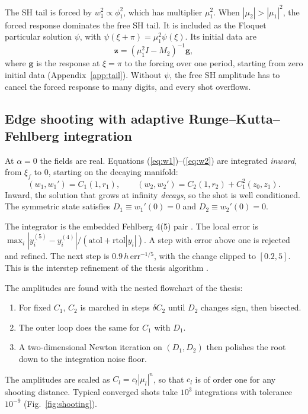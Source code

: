 \documentclass[pra,twocolumn,superscriptaddress,longbibliography]{revtex4-2}
\begin{document}
The SH tail is forced by $w_1^2\propto\phi_1^2$, which has multiplier $\mu_1^2$. When
$|\mu_2| > |\mu_1|^2$, the forced response dominates the free SH tail. It is included as the
Floquet particular solution $\psi$, with $\psi(\xi+\pi)=\mu_1^2\psi(\xi)$. Its initial data are
\begin{equation}
\bm z = (\mu_1^2 I - M_2)^{-1}\bm g, \label{eq:forced}
\end{equation}
where $\bm g$ is the response at $\xi=\pi$ to the forcing over one period, starting from zero
initial data (Appendix~\ref{app:tail}). Without $\psi$, the free SH amplitude has to cancel the
forced response to many digits, and every shot overflows.

\subsection{Edge shooting with adaptive Runge--Kutta--Fehlberg integration}
At $\alpha=0$ the fields are real. Equations (\ref{eq:w1})--(\ref{eq:w2}) are integrated
\emph{inward}, from $\xi_f$ to $0$, starting on the decaying manifold:
\begin{equation}
(w_1,w_1') = C_1(1,r_1),\qquad (w_2,w_2') = C_2(1,r_2) + C_1^2(z_0,z_1). \label{eq:tailIC}
\end{equation}
Inward, the solution that grows at infinity \emph{decays}, so the shot is well conditioned. The
symmetric state satisfies $D_1 \equiv w_1'(0) = 0$ and $D_2 \equiv w_2'(0) = 0$.

The integrator is the embedded Fehlberg 4(5) pair \cite{Fehlberg1969}. The local error is
$\max_i |y^{(5)}_i - y^{(4)}_i|/(\mathrm{atol}+\mathrm{rtol}|y_i|)$. A step with error above one is
rejected and refined. The next step is $0.9\,h\,\mathrm{err}^{-1/5}$, with the change clipped to
$[0.2,5]$. This is the interstep refinement of the thesis algorithm \cite{MoreiraThesis}.

The amplitudes are found with the nested flowchart of the thesis:
\begin{enumerate}
\item For fixed $C_1$, $C_2$ is marched in steps $\delta C_2$ until $D_2$ changes sign, then
bisected.
\item The outer loop does the same for $C_1$ with $D_1$.
\item A two-dimensional Newton iteration on $(D_1,D_2)$ then polishes the root down to the
integration noise floor.
\end{enumerate}
The amplitudes are scaled as $C_l = c_l|\mu_l|^n$, so that $c_l$ is of order one for any shooting
distance. Typical converged shots take $10^3$ integrations with tolerance $10^{-9}$
(Fig.~\ref{fig:shooting}).
\end{document}
